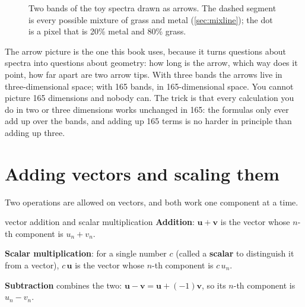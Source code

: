 \documentclass[11pt,a4paper,oneside,openany]{book}
\newcommand{\B}[1]{{\symbf{#1}}}
\newcommand{\B}[1]{{\bm{#1}}}
\newcommand{\vx}{\B{x}}
\newcommand{\vt}{\B{t}}
\newcommand{\vu}{\B{u}}
\newcommand{\vv}{\B{v}}
\newcommand{\vg}{\B{g}}
\begin{document}
\begin{figure}[ht]
\centering
{}
\caption{Two bands of the toy spectra drawn as arrows. The dashed segment is every possible mixture of grass and metal
(\cref{sec:mixline}); the dot is a pixel that is 20\% metal and 80\% grass.}
\label{fig:arrows}
\end{figure}

The arrow picture is the one this book uses, because it turns questions about spectra into questions about geometry:
how long is the arrow, which way does it point, how far apart are two arrow tips. With three bands the arrows live in
three-dimensional space; with 165 bands, in 165-dimensional space. You cannot picture 165 dimensions and nobody can.
The trick is that every calculation you do in two or three dimensions works unchanged in 165: the formulas only ever
add up over the bands, and adding up 165 terms is no harder in principle than adding up three.

\section{Adding vectors and scaling them}

Two operations are allowed on vectors, and both work one component at a time.

\begin{defn}{vector addition and scalar multiplication}
\textbf{Addition}: $\vu+\vv$ is the vector whose $n$-th component is $u_n+v_n$.

\textbf{Scalar multiplication}: for a single number $c$ (called a \textbf{scalar} to distinguish it from a vector),
$c\,\vu$ is the vector whose $n$-th component is $c\,u_n$.

\textbf{Subtraction} combines the two: $\vu-\vv=\vu+(-1)\vv$, so its $n$-th component is $u_n-v_n$.
\end{defn}
\end{document}
